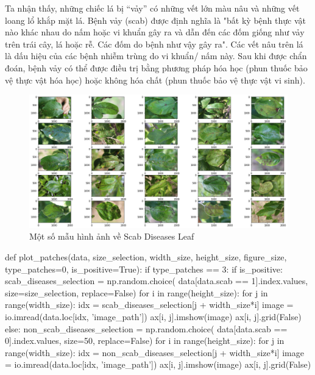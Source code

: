 \documentclass{article}
\begin{document}
	Ta nhận thấy, những chiếc lá bị “vảy” có những vết lớn màu nâu và những vết loang lổ khắp mặt lá. Bệnh vảy (scab) được định nghĩa là "bất kỳ bệnh thực vật nào khác nhau do nấm hoặc vi khuẩn gây ra và dẫn đến các đốm giống như vảy trên trái cây, lá hoặc rễ. Các đốm do bệnh như vậy gây ra". Các vết nâu trên lá là dấu hiệu của các bệnh nhiễm trùng do vi khuẩn/ nấm này. Sau khi được chẩn đoán, bệnh vảy có thể được điều trị bằng phương pháp hóa học (phun thuốc bảo vệ thực vật hóa học) hoặc không hóa chất (phun thuốc bảo vệ thực vật vi sinh).
	\begin{figure}[H]
		\centering
		\includegraphics[width=1\linewidth]{images/sample_scab_diseases_leaf.png}
		\caption{Một số mẫu hình ảnh về Scab Diseases Leaf}
		\label{fig:writing-thesis}
	\end{figure}
	\begin{python}
		def plot_patches(data, size_selection, width_size, height_size, figure_size, type_patches=0, is_positive=True):
			if type_patches == 3:
				if is_positive:
					scab_diseases_selection = np.random.choice(
					data[data.scab == 1].index.values, size=size_selection, replace=False)
					for i in range(height_size):
						for j in range(width_size):
							idx = scab_diseases_selection[j + width_size*i]
							image = io.imread(data.loc[idx, 'image_path'])
							ax[i, j].imshow(image)
							ax[i, j].grid(False)
				else:
					non_scab_diseases_selection = np.random.choice(
					data[data.scab == 0].index.values, size=50, replace=False)
					for i in range(height_size):
						for j in range(width_size):
							idx = non_scab_diseases_selection[j + width_size*i]
							image = io.imread(data.loc[idx, 'image_path'])
							ax[i, j].imshow(image)
							ax[i, j].grid(False)
	\end{python}
\end{document}
